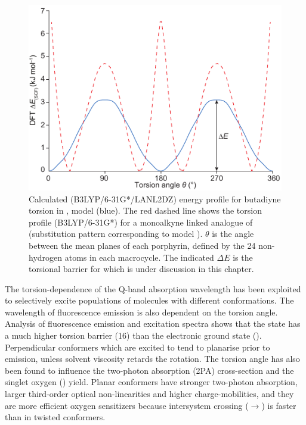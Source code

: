 	\begin{figure}[ht!]
		\centering\includegraphics{figures/dimer/Figure-2b.pdf} 
		\caption[Calc. torsion profile for ]{Calculated (B3LYP/6-31G*/LANL2DZ) energy profile for butadiyne torsion in , model  (blue). The red dashed line shows the torsion profile (B3LYP/6-31G*) for a monoalkyne linked analogue of  (substitution pattern corresponding to model ). $\theta$ is the angle between the mean planes of each porphyrin, defined by the 24 non-hydrogen atoms in each macrocycle. The indicated $\Delta E$ is the torsional barrier for  which is under discussion in this chapter.}
		\label{fig:dimer:f2}
	\end{figure}

	The torsion-dependence of the Q-band absorption wavelength has been exploited to selectively excite populations of molecules with different conformations. The wavelength of fluorescence emission is also dependent on the torsion angle. Analysis of fluorescence emission and excitation spectra shows that the  state has a much higher torsion barrier (\SI{16}{\kjmol}) than the electronic ground state ().\autocite{Winters2007} Perpendicular conformers which are excited to  tend to planarise prior to emission, unless solvent viscosity retards the rotation.\autocite{Winters2007,Kuimova2009,Kuimova2009b,Vyvsniauskas2015} The torsion angle has also been found to influence the two-photon absorption (2PA) cross-section and the singlet oxygen () yield. Planar conformers have stronger two-photon absorption,\autocite{Wilkinson2014} larger third-order optical non-linearities\autocite{Drobizhev2006} and higher charge-mobilities,\autocite{Grozema2007,Winters2007b} and they are more efficient oxygen sensitizers because intersystem crossing ($\rightarrow{}$) is faster than in twisted conformers.\autocite{Kuimova2009}

